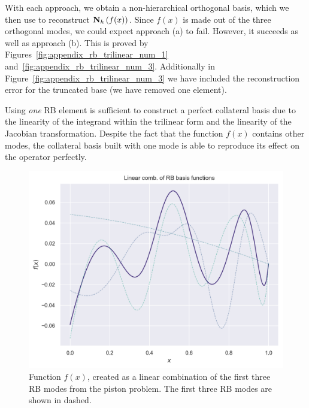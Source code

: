\documentclass[../../thesis.tex]{subfiles}
\begin{document}
With each approach, we obtain a non-hierarchical orthogonal basis,
which we then use to reconstruct $\vb{N}_h\left(f(x)\right)$.
Since $f(x)$ is made out of the three orthogonal modes, 
we could expect approach (a) to fail.
However, it succeeds as well as approach (b).
This is proved by Figures~\ref{fig:appendix_rb_trilinear_num_1} 
and~\ref{fig:appendix_rb_trilinear_num_3}.
Additionally in Figure~\ref{fig:appendix_rb_trilinear_num_3} we have included 
the reconstruction error for the truncated base (we have removed one element). 

Using \textit{one} RB element is sufficient to construct a perfect collateral basis
due to the linearity of the integrand within the trilinear form 
and the linearity of the Jacobian transformation.
Despite the fact that the function $f(x)$ contains other modes, 
the collateral basis built with one mode is able to reproduce its effect on the operator perfectly. 
\begin{figure}[h]
    \includegraphics[width=\columnwidth]{research_project/piston/figures/svd_fourier/linear_combination.png}
    \caption{Function $f(x)$, created as a linear combination of the first three RB modes 
    from the piston problem.
    The first three RB modes are shown in dashed.}
    \label{fig:appendix_rb_linear_combination}
\end{figure}
\end{document}
